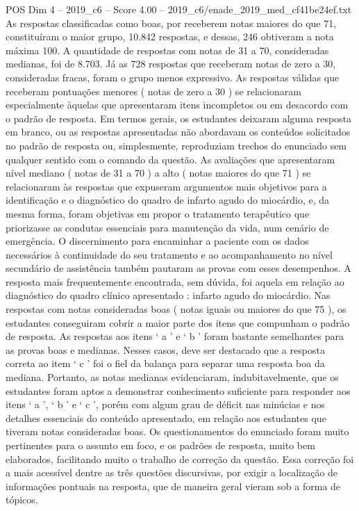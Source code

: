 \begin{textsample}{POS Dim 4 – 2019\_c6 – Score 4.00 – 2019\_c6/enade\_2019\_med\_cf41be24ef.txt}
As respostas classificadas como boas, por receberem notas maiores do que 71, constituíram o maior grupo, 10.842 respostas, e dessas, 246 obtiveram a nota máxima 100.
A quantidade de respostas com notas de 31 a 70, consideradas medianas, foi de 8.703.
Já as 728 respostas que receberam notas de zero a 30, consideradas fracas, foram o grupo menos expressivo.
As respostas válidas que receberam pontuações menores ( notas de zero a 30 ) se relacionaram especialmente àquelas que apresentaram itens incompletos ou em desacordo com o padrão de resposta.
Em termos gerais, os estudantes deixaram alguma resposta em branco, ou as respostas apresentadas não abordavam os conteúdos solicitados no padrão de resposta ou, simplesmente, reproduziam trechos do enunciado sem qualquer sentido com o comando da questão.
As avaliações que apresentaram nível mediano ( notas de 31 a 70 ) a alto ( notas maiores do que 71 ) se relacionaram às respostas que expuseram argumentos mais objetivos para a identificação e o diagnóstico do quadro de infarto agudo do miocárdio, e, da mesma forma, foram objetivas em propor o tratamento terapêutico que priorizasse as condutas essenciais para manutenção da vida, num cenário de emergência.
O discernimento para encaminhar a paciente com os dados necessários à continuidade do seu tratamento e ao acompanhamento no nível secundário de assistência também pautaram as provas com esses desempenhos.
A resposta mais frequentemente encontrada, sem dúvida, foi aquela em relação ao diagnóstico do quadro clínico apresentado : infarto agudo do miocárdio.
Nas respostas com notas consideradas boas ( notas iguais ou maiores do que 75 ), os estudantes conseguiram cobrir a maior parte dos itens que compunham o padrão de resposta.
As respostas aos itens ‘ a ’ e ‘ b ’ foram bastante semelhantes para as provas boas e medianas.
Nesses casos, deve ser destacado que a resposta correta ao item ‘ c ’ foi o fiel da balança para separar uma resposta boa da mediana.
Portanto, as notas medianas evidenciaram, indubitavelmente, que os estudantes foram aptos a demonstrar conhecimento suficiente para responder aos itens ‘ a ’, ‘ b ’ e ‘ c ’, porém com algum grau de déficit nas minúcias e nos detalhes essenciais do conteúdo apresentado, em relação aos estudantes que tiveram notas consideradas boas.
Os questionamentos do enunciado foram muito pertinentes para o assunto em foco, e os padrões de resposta, muito bem elaborados, facilitando muito o trabalho de correção da questão.
Essa correção foi a mais acessível dentre as três questões discursivas, por exigir a localização de informações pontuais na resposta, que de maneira geral vieram sob a forma de tópicos.

\end{textsample}
